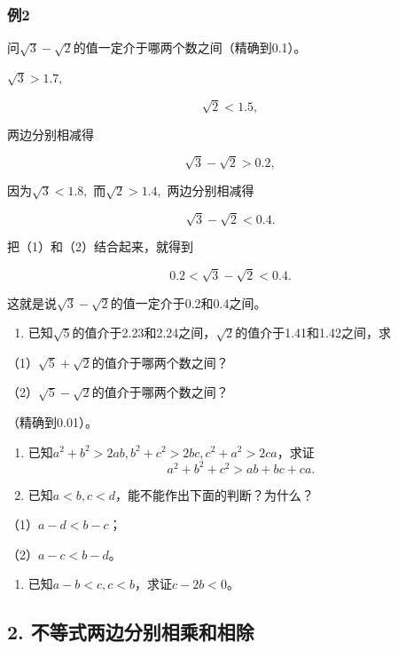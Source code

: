 \subsubsection{例2}

问\(\sqrt{3} - \sqrt{2}\)的值一定介于哪两个数之间（精确到0.1）。

 \(\sqrt{3} > 1.7,\)

\[
\sqrt{2} < 1.5,
\]

两边分别相减得

\[
\sqrt{3} - \sqrt{2} > 0.2, \tag {1}
\]

因为\(\sqrt{3} < 1.8,\) 而\(\sqrt{2} > 1.4,\) 两边分别相减得

\[
\sqrt{3} - \sqrt{2} < 0.4. \tag {2}
\]

把（1）和（2）结合起来，就得到

\[
0.2 < \sqrt{3} - \sqrt{2} < 0.4.
\]

这就是说\(\sqrt{3} -\sqrt{2}\)的值一定介于0.2和0.4之间。

\begin{enumerate}
\item
  已知\(\sqrt{5}\)的值介于2.23和2.24之间，\(\sqrt{2}\)的值介于1.41和1.42之间，求
\end{enumerate}

（1）\(\sqrt{5} + \sqrt{2}\)的值介于哪两个数之间？

（2）\(\sqrt{5} - \sqrt{2}\)的值介于哪两个数之间？

（精确到0.01）。

\begin{enumerate}[start=2]
\item
  已知\(a^2 + b^2 > 2ab, b^2 + c^2 > 2bc, c^2 + a^2 > 2ca\)，求证
\[
a^{2} + b^{2} + c^{2} > a b + b c + c a.
\]
\item
  已知\(a < b, c < d\)，能不能作出下面的判断？为什么？
\end{enumerate}

（1）\(a - d < b - c\)；

（2）\(a - c < b - d\)。

\begin{enumerate}[start=4]
\item
  已知\(a - b < c, c < b\)，求证\(c - 2b < 0\)。
\end{enumerate}

\subsection{2. 不等式两边分别相乘和相除}

